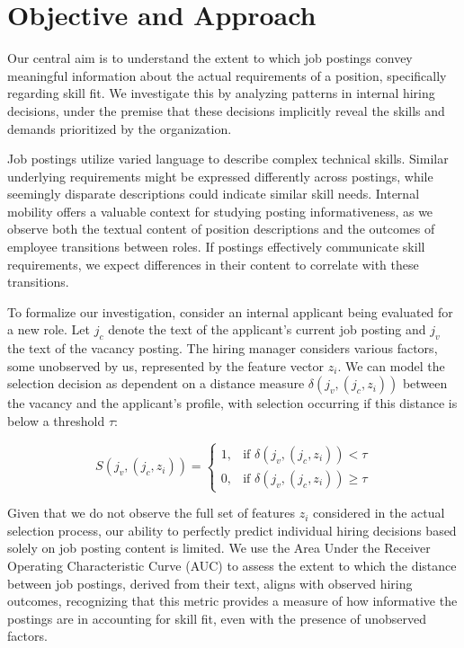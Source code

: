 
\section{Objective and Approach}\label{sec:objective_approach}

Our central aim is to understand the extent to which job postings convey meaningful information about the 
actual requirements of a position, specifically regarding skill fit. We investigate this by analyzing 
patterns in internal hiring decisions, under the premise that these decisions implicitly reveal the skills and 
demands prioritized by the organization.

Job postings utilize varied language to describe complex technical skills. Similar underlying requirements might 
be expressed differently across postings, while seemingly disparate descriptions could indicate similar skill needs. 
Internal mobility offers a valuable context for studying posting informativeness, as we observe both the textual 
content of position descriptions and the outcomes of employee transitions between roles. If postings effectively 
communicate skill requirements, we expect differences in their content to correlate with these transitions.

To formalize our investigation, consider an internal applicant being evaluated for a new role. Let $j_c$ denote 
the text of the applicant's current job posting and $j_v$ the text of the vacancy posting. The hiring manager 
considers various factors, some unobserved by us, represented by the feature vector $z_i$. We can model the 
selection decision as dependent on a distance measure $\delta(j_v, (j_c, z_i))$ between the vacancy and the 
applicant's profile, with selection occurring if this distance is below a threshold $\tau$:

\[
S(j_v, (j_c, z_i)) = 
\begin{cases} 
1, & \text{if } \delta(j_v, (j_c, z_i)) < \tau \\
0, & \text{if } \delta(j_v, (j_c, z_i)) \geq \tau
\end{cases}
\]


Given that we do not observe the full set of features $z_i$ considered in the actual selection process, our ability 
to perfectly predict individual hiring decisions based solely on job posting content is limited. We use the 
Area Under the Receiver Operating Characteristic Curve (AUC) to assess the extent to which the distance between 
job postings, derived from their text, aligns with observed hiring outcomes, recognizing that this metric 
provides a measure of how informative the postings are in accounting for skill fit, even with the presence 
of unobserved factors.

